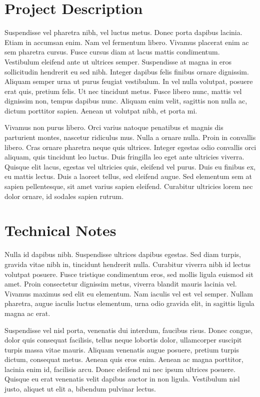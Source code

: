 \documentclass{nimemusic}
\begin{document}
\section{Project Description}

Suspendisse vel pharetra nibh, vel luctus metus. Donec porta dapibus lacinia. Etiam in accumsan enim. Nam vel fermentum libero. Vivamus placerat enim ac sem pharetra cursus. Fusce cursus diam at lacus mattis condimentum. Vestibulum eleifend ante ut ultrices semper. Suspendisse at magna in eros sollicitudin hendrerit eu sed nibh. Integer dapibus felis finibus ornare dignissim. Aliquam semper urna ut purus feugiat vestibulum. In vel nulla volutpat, posuere erat quis, pretium felis. Ut nec tincidunt metus. Fusce libero nunc, mattis vel dignissim non, tempus dapibus nunc. Aliquam enim velit, sagittis non nulla ac, dictum porttitor sapien. Aenean ut volutpat nibh, et porta mi.

Vivamus non purus libero. Orci varius natoque penatibus et magnis dis parturient montes, nascetur ridiculus mus. Nulla a ornare nulla. Proin in convallis libero. Cras ornare pharetra neque quis ultrices. Integer egestas odio convallis orci aliquam, quis tincidunt leo luctus. Duis fringilla leo eget ante ultricies viverra. Quisque elit lacus, egestas vel ultricies quis, eleifend vel purus. Duis eu finibus ex, eu mattis lectus. Duis a laoreet tellus, sed eleifend augue. Sed elementum sem at sapien pellentesque, sit amet varius sapien eleifend. Curabitur ultricies lorem nec dolor ornare, id sodales sapien rutrum.

\section{Technical Notes}

Nulla id dapibus nibh. Suspendisse ultrices dapibus egestas. Sed diam turpis, gravida vitae nibh in, tincidunt hendrerit nulla. Curabitur viverra nibh id lectus volutpat posuere. Fusce tristique condimentum eros, sed mollis ligula euismod sit amet. Proin consectetur dignissim metus, viverra blandit mauris lacinia vel. Vivamus maximus sed elit eu elementum. Nam iaculis vel est vel semper. Nullam pharetra, augue iaculis luctus elementum, urna odio gravida elit, in sagittis ligula magna ac erat.

Suspendisse vel nisl porta, venenatis dui interdum, faucibus risus. Donec congue, dolor quis consequat facilisis, tellus neque lobortis dolor, ullamcorper suscipit turpis massa vitae mauris. Aliquam venenatis augue posuere, pretium turpis dictum, consequat metus. Aenean quis eros enim. Aenean ac magna porttitor, lacinia enim id, facilisis arcu. Donec eleifend mi nec ipsum ultrices posuere. Quisque eu erat venenatis velit dapibus auctor in non ligula. Vestibulum nisl justo, aliquet ut elit a, bibendum pulvinar lectus.
\end{document}
